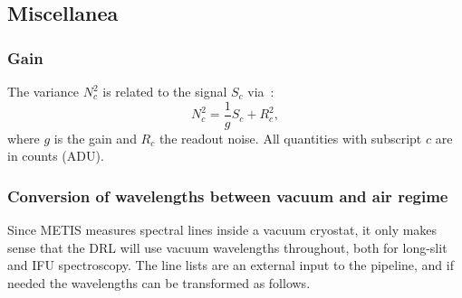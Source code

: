 \subsection{Miscellanea}
\label{ssec:miscellanea}

%

\subsubsection{Gain}
\label{sssec:gain}

The variance $N_{c}^{2}$ is related to the signal $S_{c}$ via~\cite[Section 9.1]{McLean2008}:
\begin{equation}
  \label{eq:signal-variance}
  N_{c}^{2} = \frac{1}{g} S_{c} + R_{c}^{2},
\end{equation}
where $g$ is the gain and $R_{c}$ the readout noise. All quantities with subscript $c$ are in counts (ADU).

\subsubsection{Conversion of wavelengths between vacuum and air regime}\label{ssec:vacair}

Since METIS measures spectral lines inside a vacuum cryostat, it only makes
sense that the DRL will use vacuum wavelengths throughout, both for long-slit
and IFU spectroscopy. The line lists are an external input to the pipeline, and
if needed the wavelengths can be transformed as follows.

